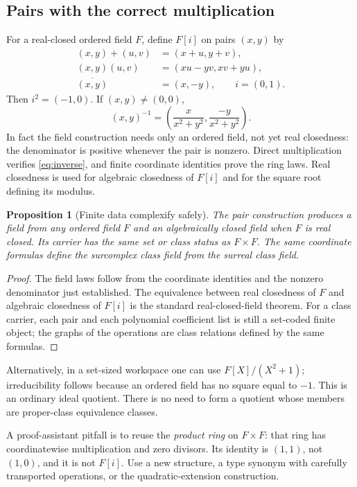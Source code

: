 \documentclass[11pt,letterpaper]{article}
\numberwithin{equation}{section}
\newtheorem{proposition}[theorem]{Proposition}
\theoremstyle{definition}
\theoremstyle{remark}
\begin{document}
\subsection{Pairs with the correct multiplication}
For a real-closed ordered field $F$, define $F[i]$ on pairs $(x,y)$ by
\begin{align*}
(x,y)+(u,v)&=(x+u,y+v),\\
(x,y)(u,v)&=(xu-yv,xv+yu),\\
\overline{(x,y)}&=(x,-y),\qquad i=(0,1).
\end{align*}
Then $i^2=(-1,0)$. If $(x,y)\ne(0,0)$,
\begin{equation}\label{eq:inverse}
(x,y)^{-1}=\left(\frac{x}{x^2+y^2},\frac{-y}{x^2+y^2}\right).
\end{equation}
In fact the field construction needs only an ordered field, not yet real closedness: the denominator is positive whenever the pair is nonzero. Direct multiplication verifies \eqref{eq:inverse}, and finite coordinate identities prove the ring laws. Real closedness is used for algebraic closedness of $F[i]$ and for the square root defining its modulus.

\begin{proposition}[Finite data complexify safely]\label{prop:complex}
The pair construction produces a field from any ordered field $F$ and an algebraically closed field when $F$ is real closed. Its carrier has the same set or class status as $F\times F$. The same coordinate formulas define the surcomplex class field from the surreal class field.
\end{proposition}
\begin{proof}
The field laws follow from the coordinate identities and the nonzero denominator just established. The equivalence between real closedness of $F$ and algebraic closedness of $F[i]$ is the standard real-closed-field theorem. For a class carrier, each pair and each polynomial coefficient list is still a set-coded finite object; the graphs of the operations are class relations defined by the same formulas.
\end{proof}
Alternatively, in a set-sized workspace one can use $F[X]/(X^2+1)$; irreducibility follows because an ordered field has no square equal to $-1$. This is an ordinary ideal quotient. There is no need to form a quotient whose members are proper-class equivalence classes.

A proof-assistant pitfall is to reuse the \emph{product ring} on $F\times F$: that ring has coordinatewise multiplication and zero divisors. Its identity is $(1,1)$, not $(1,0)$, and it is not $F[i]$. Use a new structure, a type synonym with carefully transported operations, or the quadratic-extension construction.
\end{document}

